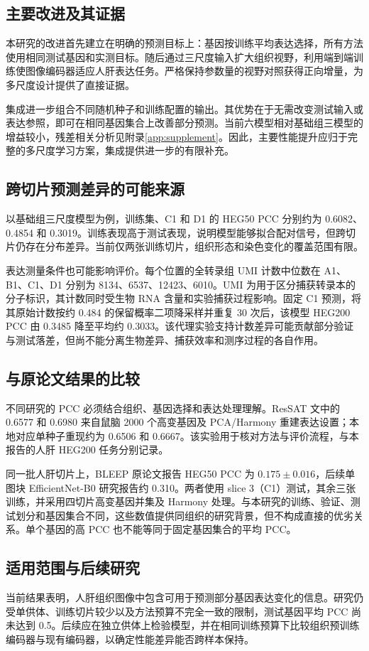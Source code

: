 \documentclass[UTF8,a4paper,11pt,fontset=fandol]{ctexart}
\begin{document}
\subsection{主要改进及其证据}
本研究的改进首先建立在明确的预测目标上：基因按训练平均表达选择，所有方法使用相同测试基因和实测目标。随后通过三尺度输入扩大组织视野，利用端到端训练使图像编码器适应人肝表达任务。严格保持参数量的视野对照获得正向增量，为多尺度设计提供了直接证据。

集成进一步组合不同随机种子和训练配置的输出。其优势在于无需改变测试输入或表达参照，即可在相同基因集合上改善部分预测。当前六模型相对基础组三模型的增益较小，残差相关分析见附录\ref{app:supplement}。因此，主要性能提升应归于完整的多尺度学习方案，集成提供进一步的有限补充。

\subsection{跨切片预测差异的可能来源}
以基础组三尺度模型为例，训练集、C1 和 D1 的 HEG50 PCC 分别约为 0.6082、0.4854 和 0.3019。训练表现高于测试表现，说明模型能够拟合配对信号，但跨切片仍存在分布差异。当前仅两张训练切片，组织形态和染色变化的覆盖范围有限。

表达测量条件也可能影响评价。每个位置的全转录组 UMI 计数中位数在 A1、B1、C1、D1 分别为 8134、6537、12423、6010。UMI 为用于区分捕获转录本的分子标识，其计数同时受生物 RNA 含量和实验捕获过程影响。固定 C1 预测，将其原始计数按约 0.484 的保留概率二项降采样并重复 30 次后，该模型 HEG200 PCC 由 0.3485 降至平均约 0.3033。该代理实验支持计数差异可能贡献部分验证与测试落差，但尚不能分离生物差异、捕获效率和测序过程的各自作用。

\subsection{与原论文结果的比较}
不同研究的 PCC 必须结合组织、基因选择和表达处理理解。ResSAT 文中的 0.6577 和 0.6980 来自鼠脑 2000 个高变基因及 PCA/Harmony 重建表达设置；本地对应单种子重现约为 0.6506 和 0.6667。该实验用于核对方法与评价流程，与本报告的人肝 HEG200 任务分别记录。

同一批人肝切片上，BLEEP 原论文报告 HEG50 PCC 为 $0.175\pm0.016$，后续单图块 EfficientNet-B0 研究报告约 0.310\cite{bleep,singlepatch}。两者使用 slice 3（C1）测试，其余三张训练，并采用四切片高变基因并集及 Harmony 处理。与本研究的训练、验证、测试划分和基因集合不同，这些数值提供同组织的研究背景，但不构成直接的优劣关系。单个基因的高 PCC 也不能等同于固定基因集合的平均 PCC。

\subsection{适用范围与后续研究}
当前结果表明，人肝组织图像中包含可用于预测部分基因表达变化的信息。研究仍受单供体、训练切片较少以及方法预算不完全一致的限制，测试基因平均 PCC 尚未达到 0.5。后续应在独立供体上检验模型，并在相同训练预算下比较组织预训练编码器与现有编码器，以确定性能差异能否跨样本保持。
\end{document}
